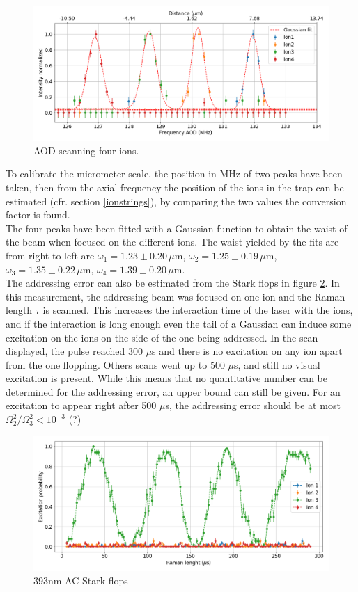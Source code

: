\begin{figure}[H]
\centering
\includegraphics[width=\textwidth]{img/AODScan}
\caption{AOD scanning four ions.}
\label{AODscan}
\end{figure}
To calibrate the micrometer scale, the position in MHz of two peaks have been taken, then from the axial frequency the position of the ions in the trap can be estimated (cfr. section \ref{ionstrings}), by comparing the two values the conversion factor is found.\\
The four peaks have been fitted with a Gaussian function to obtain the waist of the beam when focused on the different ions. The waist yielded by the fits are from right to left are
$\omega_1 = 1.23\pm 0.20\,\mu$m, $\omega_2 = 1.25\pm 0.19\,\mu$m, $ \omega_3 = 1.35\pm 0.22\,\mu$m, $\omega_4 = 1.39\pm 0.20\,\mu$m.\\
The addressing error can also be estimated from the Stark flops in figure \ref{ACscan}. In this measurement, the addressing beam was focused on one ion and the Raman length $\tau$ is scanned. This increases the interaction time of the laser with the ions, and if the interaction is long enough even the tail of a Gaussian can induce some excitation on the ions on the side of the one being addressed. In the scan displayed, the pulse reached 300 $\mu$s and there is no excitation on any ion apart from the one flopping. Others scans went up to 500 $\mu$s, and still no visual excitation is present. While this means that no quantitative number can be determined for the addressing error, an upper bound can still be given. For an excitation to appear right after 500 $\mu$s, the addressing error should be at most $\Omega_2^2/\Omega_3^2< 10^{-3}$ (?)


\begin{figure}[H]
\centering
\includegraphics[width=\textwidth]{img/ACscan}
\caption{393nm AC-Stark flops}
\label{ACscan}
\end{figure}

